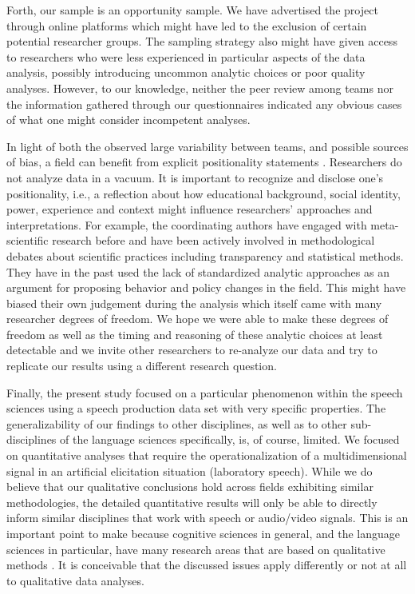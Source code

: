 \documentclass[Review,times,sageh]{sagej}
\begin{document}
Forth, our sample is an opportunity sample.
We have advertised the project through online platforms which might have led to the exclusion of certain potential researcher groups.
The sampling strategy also might have given access to researchers who were less experienced in particular aspects of the data analysis, possibly introducing uncommon analytic choices or poor quality analyses.
However, to our knowledge, neither the peer review among teams nor the information gathered through our questionnaires indicated any obvious cases of what one might consider incompetent analyses.

In light of both the observed large variability between teams, and possible sources of bias, a field can benefit from explicit positionality statements \citep[e.g.,][]{jafar2018, darwin2020, fox2021open}.
Researchers do not analyze data in a vacuum.
It is important to recognize and disclose one's positionality, i.e., a reflection about how educational background, social identity, power, experience and context might influence researchers' approaches and interpretations.
For example, the coordinating authors have engaged with meta-scientific research before and have been actively involved in methodological debates about scientific practices including transparency and statistical methods.
They have in the past used the lack of standardized analytic approaches as an argument for proposing behavior and policy changes in the field.
This might have biased their own judgement during the analysis which itself came with many researcher degrees of freedom.
We hope we were able to make these degrees of freedom as well as the timing and reasoning of these analytic choices at least detectable and we invite other researchers to re-analyze our data and try to replicate our results using a different research question.

Finally, the present study focused on a particular phenomenon within the speech sciences using a speech production data set with very specific properties.
The generalizability of our findings to other disciplines, as well as to other sub-disciplines of the language sciences specifically, is, of course, limited.
We focused on quantitative analyses that require the operationalization of a multidimensional signal in an artificial elicitation situation (laboratory speech).
While we do believe that our qualitative conclusions hold across fields exhibiting similar methodologies, the detailed quantitative results will only be able to directly inform similar disciplines that work with speech or audio/video signals.
This is an important point to make because cognitive sciences in general, and the language sciences in particular, have many research areas that are based on qualitative methods \citep{haven2019}.
It is conceivable that the discussed issues apply differently or not at all to qualitative data analyses.
\end{document}
